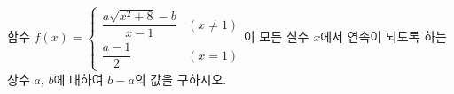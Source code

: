 함수 $f(x)=\begin{cases} \dfrac{a\sqrt{x^2+8}-b}{x-1} & (x\ne 1) \\[1.5ex] \dfrac{a-1}{2} & (x=1) \end{cases}$이 모든 실수 $x$에서 연속이 되도록 하는 상수 $a$, $b$에 대하여 $b-a$의 값을 구하시오.
